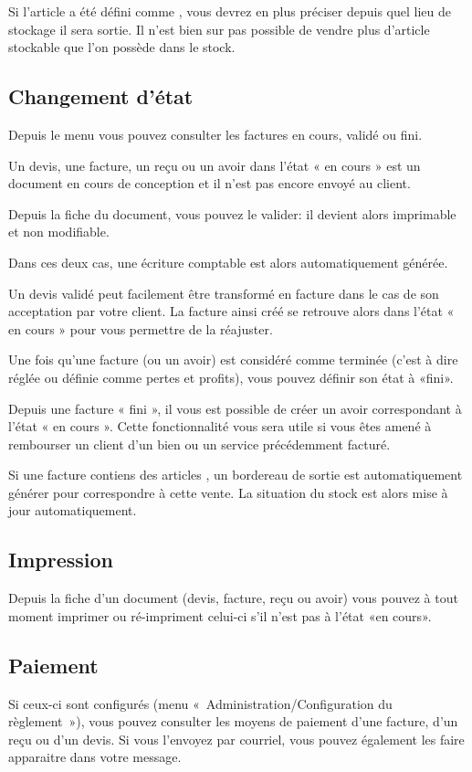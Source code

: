\documentclass[a4paper,10pt,oneside,french]{sphinxmanual}
\begin{document}
Si l’article a été défini comme , vous devrez en plus préciser depuis quel lieu de stockage il sera sortie.
Il n’est bien sur pas possible de vendre plus d’article stockable que l’on possède dans le stock.


\subsection{Changement d’état}
\label{\detokenize{invoice/create_bill:changement-d-etat}}
Depuis le menu  vous pouvez consulter les factures en cours, validé ou fini.

Un devis, une facture, un reçu ou un avoir dans l’état « en cours » est un document en cours de conception et il n’est pas encore envoyé au client.

Depuis la fiche du document, vous pouvez le valider: il devient alors imprimable et non modifiable.

Dans ces deux cas, une écriture comptable est alors automatiquement générée.

Un devis validé peut facilement être transformé en facture dans le cas de son acceptation par votre client. La facture ainsi créé se retrouve alors dans l’état « en cours » pour vous permettre de la réajuster.

Une fois qu’une facture (ou un avoir) est considéré comme terminée (c’est à dire réglée ou définie comme pertes et profits), vous pouvez définir son état à «fini».

Depuis une facture « fini », il vous est possible de créer un avoir correspondant à l’état « en cours ». Cette fonctionnalité vous sera utile si vous êtes amené à rembourser un client d’un bien ou un service précédemment facturé.

Si une facture contiens des articles , un bordereau de sortie est automatiquement générer pour correspondre à cette vente.
La situation du stock est alors mise à jour automatiquement.


\subsection{Impression}
\label{\detokenize{invoice/create_bill:impression}}
Depuis la fiche d’un document (devis, facture, reçu ou avoir) vous pouvez à tout moment imprimer ou ré-impriment celui-ci s’il n’est pas à l’état «en cours».


\subsection{Paiement}
\label{\detokenize{invoice/create_bill:paiement}}
Si ceux-ci sont configurés (menu « Administration/Configuration du règlement »), vous pouvez consulter les moyens de paiement d’une facture, d’un reçu ou d’un devis.
Si vous l’envoyez par courriel, vous pouvez également les faire apparaitre dans votre message.
\end{document}
